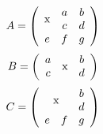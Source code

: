 \documentclass{article}
\begin{document}
\[ A=\left(\begin{array}{ccc} \multirow{2}{*}{x} & a & b \\ & c & d \\ e & f & g \end{array}\right) \]
\[ B=\left(\begin{array}{ccc} a & \multirow{2}{*}{x} & b \\ c & & d \end{array}\right) \]
\[ C=\left(\begin{array}{ccc} \multicolumn{2}{c}{\multirow{2}{*}{x}} & b \\ & & d \\ e & f & g \end{array}\right) \]
\end{document}
